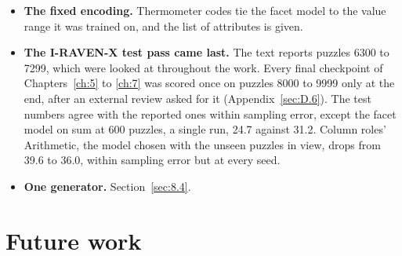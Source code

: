 \begin{itemize}
\item \textbf{The fixed encoding.} Thermometer codes tie the facet model to the value range it was trained on, and the list of attributes is given.
\item \textbf{The I-RAVEN-X test pass came last.} The text reports puzzles 6300 to 7299, which were looked at throughout the work. Every final checkpoint of Chapters~\ref{ch:5} to \ref{ch:7} was scored once on puzzles 8000 to 9999 only at the end, after an external review asked for it (Appendix~\ref{sec:D.6}). The test numbers agree with the reported ones within sampling error, except the facet model on sum at 600 puzzles, a single run, 24.7 against 31.2. Column roles' Arithmetic, the model chosen with the unseen puzzles in view, drops from 39.6 to 36.0, within sampling error but at every seed.
\item \textbf{One generator.} Section~\ref{sec:8.4}.
\end{itemize}

\section{Future work}\label{sec:8.7}


